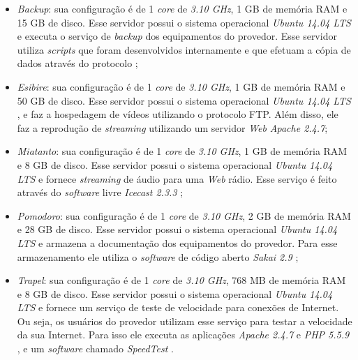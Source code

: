 \begin{itemize}
 \item \textit{Backup}: sua configuração é de 1 \textit{core} de \textit{3.10 GHz}, 1 GB de memória \ac{RAM} e 15 GB de disco. 
 Esse servidor possui o sistema operacional \textit{Ubuntu 14.04 \ac{LTS}} \cite{ubuntu} e executa o serviço de \textit{backup} dos equipamentos 
 do provedor. Esse servidor utiliza \textit{scripts} que foram desenvolvidos internamente e que efetuam a cópia de dados através do protocolo
 ;
 
 \item \textit{Esibire}: sua configuração é de 1 \textit{core} de \textit{3.10 GHz}, 1 GB de memória \ac{RAM} e 50 GB de disco. 
 Esse servidor possui o sistema operacional \textit{Ubuntu 14.04 \ac{LTS}} \cite{ubuntu}, e faz a hospedagem de vídeos utilizando o 
 protocolo \ac{FTP}. Além disso, ele faz a reprodução de \textit{streaming} utilizando um servidor \textit{Web} \textit{Apache 2.4.7};
 
 \item \textit{Miatanto}: sua configuração é de 1 \textit{core} de \textit{3.10 GHz}, 1 GB de memória \ac{RAM} e 8 GB de disco. 
 Esse servidor possui o sistema operacional \textit{Ubuntu 14.04 \ac{LTS}} \cite{ubuntu} e fornece \textit{streaming} de áudio para uma \textit{Web} 
 rádio. Esse serviço é feito através do \textit{software} livre \textit{Icecast 2.3.3} \cite{icecast};
 
 \item \textit{Pomodoro}: sua configuração é de 1 \textit{core} de \textit{3.10 GHz}, 2 GB de memória \ac{RAM} e 28 GB de disco. 
 Esse servidor possui o sistema operacional \textit{Ubuntu 14.04 \ac{LTS}} \cite{ubuntu} e armazena a documentação dos equipamentos do provedor. 
 Para esse armazenamento ele utiliza o \textit{software} de código aberto \textit{Sakai 2.9} \cite{sakai};
 
 \item \textit{Trapel}: sua configuração é de 1 \textit{core} de \textit{3.10 GHz}, 768 MB de memória \ac{RAM} e 8 GB de disco. 
 Esse servidor possui o sistema operacional \textit{Ubuntu 14.04 \ac{LTS}} \cite{ubuntu} e fornece um serviço de teste de velocidade para conexões 
 de Internet. Ou seja, os usuários do provedor utilizam esse serviço para testar a velocidade da sua Internet. Para isso ele executa as aplicações 
 \textit{Apache 2.4.7} \cite{apache} e \textit{\ac{PHP} 5.5.9} \cite{php}, e um \textit{software} chamado \textit{SpeedTest} \cite{speedtest}.
\end{itemize}

